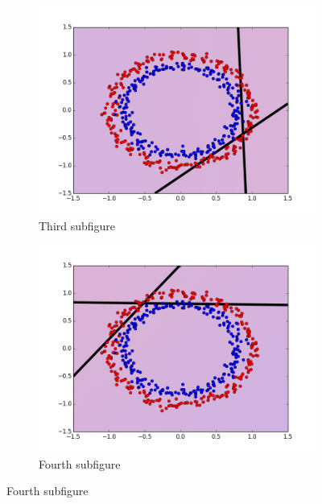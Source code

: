 \begin{figure}[H]
\medskip
\begin{subfigure}{0.48\textwidth}
\includegraphics[width=\linewidth]{figs/Circle/33-two-circle}
\caption{Third subfigure} \label{fig:Circle_all_single_c}
\end{subfigure}\hspace*{\fill}
\begin{subfigure}{0.48\textwidth}
\includegraphics[width=\linewidth]{figs/Circle/44-two-circle}
\caption{Fourth subfigure} \label{fig:Circle_all_single_d}
\end{subfigure}


\end{figure}
